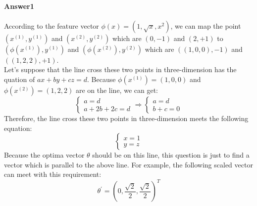 \documentclass[paper=a4, fontsize=11pt]{scrartcl} %
\numberwithin{equation}{section} %
\numberwithin{figure}{section} %
\numberwithin{table}{section} %
\begin{document}
\paragraph{\textbf{Answer1}}
According to the feature vector $\phi \left ( x \right )=\left ( 1,\sqrt{x},x^{2} \right )$, we can map the point $\left ( x^{\left ( 1 \right )},y^{\left ( 1 \right )} \right )$ and $\left ( x^{\left ( 2 \right )},y^{\left ( 2 \right )} \right )$ which are $\left( 0,-1 \right )$ and $\left( 2,+1 \right )$ to $\left( \phi \left ( x^{\left ( 1 \right )} \right ),y^{\left ( 1 \right )} \right )$ and $\left( \phi \left ( x^{\left ( 2 \right )} \right ),y^{\left ( 2 \right )} \right )$ which are $\left ( \left ( 1,0,0 \right ),-1 \right )$ and $\left ( \left (1,2,2 \right ),+1 \right )$.
\\ Let's suppose that the line cross these two points in three-dimension has the quation of $ax+by+cz=d$. Because $\phi \left ( x^{\left ( 1 \right )} \right )=\left ( 1,0,0 \right )$ and $\phi \left ( x^{\left ( 2 \right )} \right )=\left ( 1,2,2 \right )$ are on the line, we can get:
\begin{equation*}
\left\{\begin{matrix}
a=d\\ 
a+2b+2c=d
\end{matrix}\right.\Rightarrow 
\left\{\begin{matrix}
a=d\\ 
b+c=0
\end{matrix}\right.
\end{equation*}
Therefore, the line cross these two points in three-dimension meets the following equation:
\begin{equation*}
\left\{\begin{matrix}
x=1\\ 
y=z
\end{matrix}\right.
\end{equation*}
Because the optima vector $\theta$ should be on this line, this question is just to find a vector which is parallel to the above line. For example, the following scaled vector can meet with this requirement:
\begin{equation*}
\theta^{'} = \left(0, \frac{\sqrt{2}}{2}, \frac{\sqrt{2}}{2}\right)^{T}
\end{equation*}
\end{document}
